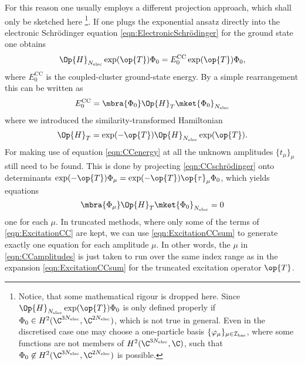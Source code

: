 For this reason one usually employs a different projection approach,
which shall only be sketched here%
\footnote{Notice, that some mathematical rigour is dropped here.
	Since $\Op{H}_{\Nelec} \exp(\op{T}) \Phi_0$ is only defined properly
	if $\Phi_0 \in H^2(\C^{3\Nelec}, \C^{2\Nelec})$,
	which is not true in general.
	Even in the discretised case one may choose a one-particle basis $\{\varphi_\mu\}_{\mu\in\mathcal{I}_\text{bas}}$,
	where some functions are not members of $H^2(\C^{3\Nelec}, \C)$,
	such that $\Phi_0 \not\in H^2(\C^{3\Nelec}, \C^{2\Nelec})$ is possible.
}.
If one plugs the exponential ansatz directly into the electronic Schrödinger equation
\eqref{eqn:ElectronicSchrödinger} for the ground state one obtains
\begin{equation}
	\Op{H}_{\Nelec} \exp(\op{T}) \Phi_0 = E_0^\text{CC} \exp(\op{T}) \Phi_0,
	\label{eqn:CCschrödinger}
\end{equation}
where $E_0^\text{CC}$ is the coupled-cluster ground-state energy.
By a simple rearrangement this can be written as
\begin{equation}
	E_0^\text{CC} = \mbra{\Phi_0} \Op{H}_T \mket{\Phi_0}_{\Nelec}
	\label{eqn:CCenergy}
\end{equation}
where we introduced the similarity-transformed Hamiltonian
\[ \Op{H}_T = \exp(-\op{T}) \Op{H}_{\Nelec} \exp(\op{T}). \]
For making use of equation \eqref{eqn:CCenergy}
at all the unknown amplitudes $\{t_\mu\}_{\mu}$ still need to be found.
This is done by projecting \eqref{eqn:CCschrödinger}
onto determinants $\exp(-\op{T}) \Phi_\mu = \exp(-\op{T}) \op{\tau}_\mu \Phi_0$,
which yields equations
\begin{equation}
	\mbra{\Phi_\mu} \Op{H}_T \mket{\Phi_0}_{\Nelec} = 0
	\label{eqn:CCamplitudes}
\end{equation}
one for each $\mu$.
In truncated \CC methods, where only some of the terms of \eqref{eqn:ExcitationCC} are kept,
we can use \eqref{eqn:ExcitationCCsum} to generate exactly one equation
for each amplitude $\mu$.
In other words, the $\mu$ in \eqref{eqn:CCamplitudes} is just taken to run over the same
index range as in the expansion \eqref{eqn:ExcitationCCsum} for the truncated
excitation operator $\op{T}$.

